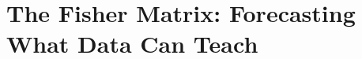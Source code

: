 \chapter{The Fisher Matrix: Forecasting What Data Can Teach}\label{ch:10}
\providecommand{\TenACowFaa}{}\renewcommand{\TenACowFaa}{450}
\providecommand{\TenACowFab}{}\renewcommand{\TenACowFab}{-90}
\providecommand{\TenACowFbb}{}\renewcommand{\TenACowFbb}{99}
\providecommand{\TenACowIaa}{}\renewcommand{\TenACowIaa}{0.2250}
\providecommand{\TenACowIab}{}\renewcommand{\TenACowIab}{-0.0451}
\providecommand{\TenACowIbb}{}\renewcommand{\TenACowIbb}{0.0497}
\providecommand{\TenACowSa}{}\renewcommand{\TenACowSa}{0.052}
\providecommand{\TenACowSb}{}\renewcommand{\TenACowSb}{0.111}
\providecommand{\TenACowRho}{}\renewcommand{\TenACowRho}{0.43}
\providecommand{\TenACowCondA}{}\renewcommand{\TenACowCondA}{0.047}
\providecommand{\TenACowCondB}{}\renewcommand{\TenACowCondB}{0.100}
\providecommand{\TenACowMSa}{}\renewcommand{\TenACowMSa}{0.050}
\providecommand{\TenACowMSb}{}\renewcommand{\TenACowMSb}{0.108}
\providecommand{\TenACowMRho}{}\renewcommand{\TenACowMRho}{0.44}
\providecommand{\TenACowMeanA}{}\renewcommand{\TenACowMeanA}{0.498}
\providecommand{\TenACowMeanB}{}\renewcommand{\TenACowMeanB}{0.508}
\providecommand{\TenACowOneA}{}\renewcommand{\TenACowOneA}{0.484}
\providecommand{\TenACowOneB}{}\renewcommand{\TenACowOneB}{0.590}
\providecommand{\TenACowOneSa}{}\renewcommand{\TenACowOneSa}{0.053}
\providecommand{\TenACowOneSb}{}\renewcommand{\TenACowOneSb}{0.115}
\providecommand{\TenACowOneRho}{}\renewcommand{\TenACowOneRho}{0.38}
\providecommand{\TenACowInSixEight}{}\renewcommand{\TenACowInSixEight}{0.704}
\providecommand{\TenACowInNineFive}{}\renewcommand{\TenACowInNineFive}{0.974}
\providecommand{\TenACowErrSixEight}{}\renewcommand{\TenACowErrSixEight}{0.021}
\providecommand{\TenACowErrNineFive}{}\renewcommand{\TenACowErrNineFive}{0.009}
\providecommand{\TenACowNexp}{}\renewcommand{\TenACowNexp}{500}
\providecommand{\TenACowNev}{}\renewcommand{\TenACowNev}{2000}
\providecommand{\TenACowNrep}{}\renewcommand{\TenACowNrep}{2000}
\providecommand{\TenACowRatioFifty}{}\renewcommand{\TenACowRatioFifty}{1.57}
\providecommand{\TenACowRatioFiftyB}{}\renewcommand{\TenACowRatioFiftyB}{1.73}
\providecommand{\TenACowRatioTwoK}{}\renewcommand{\TenACowRatioTwoK}{1.03}
\providecommand{\TenACowRatioTwoKB}{}\renewcommand{\TenACowRatioTwoKB}{1.00}
\providecommand{\TenACowRatioErr}{}\renewcommand{\TenACowRatioErr}{0.03}
\providecommand{\TenACowRatioHundred}{}\renewcommand{\TenACowRatioHundred}{1.11}
\providecommand{\TenACowRatioHundredB}{}\renewcommand{\TenACowRatioHundredB}{1.15}
